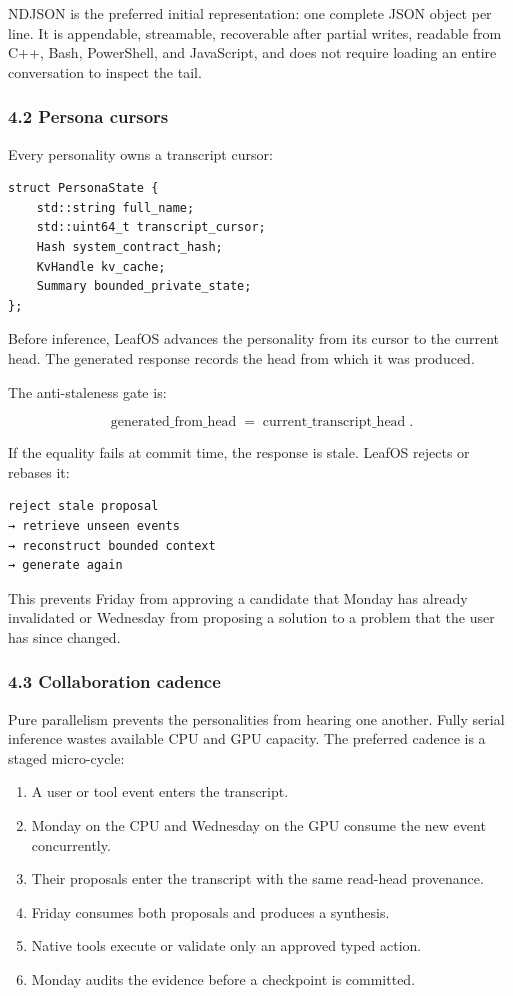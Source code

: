 NDJSON is the preferred initial representation: one complete JSON object per
line. It is appendable, streamable, recoverable after partial writes, readable
from C++, Bash, PowerShell, and JavaScript, and does not require loading an
entire conversation to inspect the tail.

\subsubsection{4.2 Persona cursors}

Every personality owns a transcript cursor:

\begin{verbatim}
struct PersonaState {
    std::string full_name;
    std::uint64_t transcript_cursor;
    Hash system_contract_hash;
    KvHandle kv_cache;
    Summary bounded_private_state;
};
\end{verbatim}

Before inference, LeafOS advances the personality from its cursor to the current
head. The generated response records the head from which it was produced.

The anti-staleness gate is:

\[
\operatorname{generated\_from\_head}
=
\operatorname{current\_transcript\_head}.
\]

If the equality fails at commit time, the response is stale. LeafOS rejects or
rebases it:

\begin{verbatim}
reject stale proposal
→ retrieve unseen events
→ reconstruct bounded context
→ generate again
\end{verbatim}

This prevents Friday from approving a candidate that Monday has already
invalidated or Wednesday from proposing a solution to a problem that the user
has since changed.

\subsubsection{4.3 Collaboration cadence}

Pure parallelism prevents the personalities from hearing one another. Fully
serial inference wastes available CPU and GPU capacity. The preferred cadence
is a staged micro-cycle:

\begin{enumerate}
\def\labelenumi{\arabic{enumi}.}
\item
  A user or tool event enters the transcript.
\item
  Monday on the CPU and Wednesday on the GPU consume the new event
  concurrently.
\item
  Their proposals enter the transcript with the same read-head provenance.
\item
  Friday consumes both proposals and produces a synthesis.
\item
  Native tools execute or validate only an approved typed action.
\item
  Monday audits the evidence before a checkpoint is committed.
\end{enumerate}

